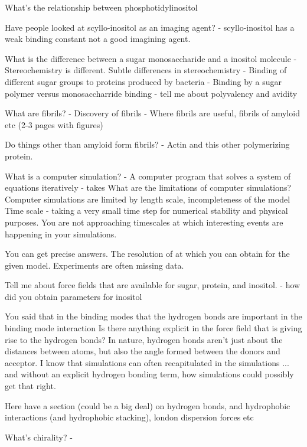 What's the relationship between phosphotidylinositol 


Have people looked at scyllo-inositol as an imaging agent?
	- scyllo-inositol has a weak binding constant not a good imagining agent.

What is the difference between a sugar monosaccharide and a inositol molecule
	- Stereochemistry is different.  Subtle differences in stereochemistry 
		- Binding of different sugar groups to proteins produced by bacteria
			- Binding by a sugar polymer versus monosaccharride binding
			- tell me about polyvalency and avidity


What are fibrils?
	- Discovery of fibrils
	- Where fibrils are useful, fibrils of amyloid etc (2-3 pages with figures)

Do things other than amyloid form fibrils?
- Actin and this other polymerizing protein.


What is a computer simulation?
	- A computer program that solves a system of equations iteratively
	- takes
What are the limitations of computer simulations?
Computer simulations are limited by length scale, incompleteness of the model
Time scale - taking a very small time step for numerical stability and physical purposes.
You are not approaching timescales at which interesting events are happening in your simulations.

You can get precise answers.  The resolution of at which you can obtain for the given model.  Experiments are often missing data.

Tell me about force fields that are available for sugar, protein, and inositol.
 - how did you obtain parameters for inositol

You said that in the binding modes that the hydrogen bonds are important in the binding mode interaction
Is there anything explicit in the force field that is giving rise to the hydrogen bonds? 
In nature, hydrogen bonds aren't just about the distances between atoms, but also the angle formed between the donors and acceptor.
I know that simulations can often recapitulated in the simulations ... and without an explicit hydrogen bonding term, how simulations could possibly get that right.

Here have a section (could be a big deal) on hydrogen bonds, and hydrophobic interactions (and hydrophobic stacking), london dispersion forces etc


What's chirality?
  - 






			



